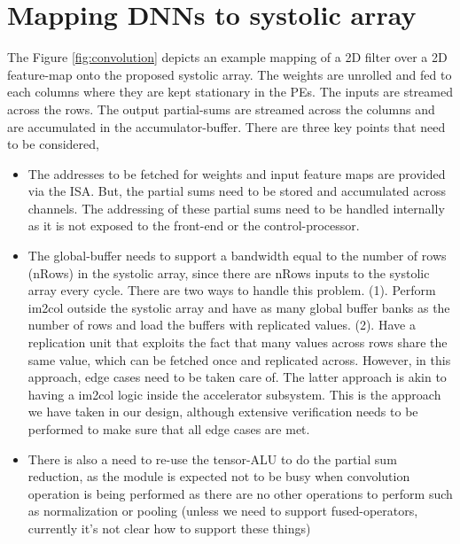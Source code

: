 \section{Mapping DNNs to systolic array}

The Figure \ref{fig:convolution} depicts an example mapping of a 2D filter over a 2D feature-map onto the proposed systolic array. The weights are unrolled and fed to each columns where they are kept stationary in the PEs. The inputs are streamed across the rows. The output partial-sums are streamed across the columns and are accumulated in the accumulator-buffer. 
There are three key points that need to be considered,
\begin{itemize}
    \item The addresses to be fetched for weights and input feature maps are provided via the ISA. But, the partial sums need to be stored and accumulated across channels. The addressing of these partial sums need to be handled internally as it is not exposed to the front-end or the control-processor.
    \item The global-buffer needs to support a bandwidth equal to the number of rows (nRows) in the systolic array, since there are nRows inputs to the systolic array every cycle. There are two ways to handle this problem. (1). Perform im2col outside the systolic array and have as many global buffer banks as the number of rows and load the buffers with replicated values. (2). Have a replication unit that exploits the fact that many values across rows share the same value, which can be fetched once and replicated across. However, in this approach, edge cases need to be taken care of. The latter approach is akin to having a im2col logic inside the accelerator subsystem. This is the approach we have taken in our design, although extensive verification needs to be performed to make sure that all edge cases are met.
    \item There is also a need to re-use the tensor-ALU to do the partial sum reduction, as the module is expected not to be busy when convolution operation is being performed as there are no other operations to perform such as normalization or pooling (unless we need to support fused-operators, currently it's not clear how to support these things)

\end{itemize}

